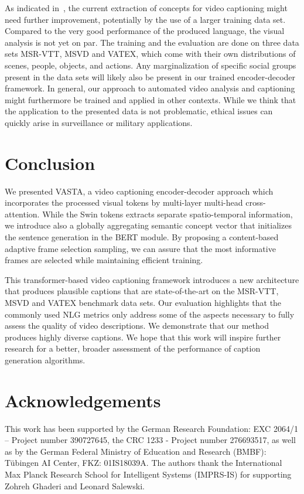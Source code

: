 \documentclass[runningheads,table]{llncs}
\newcommand{\modelName}{VASTA\xspace}
\begin{document}
As indicated in~, the current extraction of concepts for video captioning might need further improvement, potentially by the use of a larger training data set. Compared to the very good performance of the produced language, the visual analysis is not yet on par. 
The training and the evaluation are done on three data sets MSR-VTT, MSVD and VATEX, which come with their own distributions of scenes, people, objects, and actions. Any marginalization of specific social groups present in the data sets will likely also be present in our trained encoder-decoder framework. 
In general, our approach to automated video analysis and captioning might furthermore be trained and applied in other contexts. While we think that the application to the presented data is not problematic, ethical issues can quickly arise in surveillance or military applications. 



\section{Conclusion}
We presented \modelName, a video captioning encoder-decoder approach which incorporates the processed visual tokens by multi-layer multi-head cross-attention. While the Swin tokens extracts separate spatio-temporal information, we introduce also a globally aggregating semantic concept vector that initializes the sentence generation in the BERT module. 
By proposing a content-based adaptive frame selection sampling, we can assure that the most informative frames are selected while maintaining efficient training.

This transformer-based video captioning framework introduces a new architecture that produces plausible captions that are state-of-the-art on the MSR-VTT, MSVD and VATEX benchmark data sets. Our evaluation highlights that the commonly used NLG metrics only address some of the aspects necessary to fully assess the quality of video descriptions. We demonstrate that our method produces highly diverse captions. We hope that this work will inspire further research for a better, broader assessment of the performance of caption generation algorithms.
 \section{Acknowledgements} This work has been supported by the German Research Foundation: EXC 2064/1 – Project number 390727645, the CRC 1233 - Project number 276693517, as well as by the German Federal Ministry of Education and Research (BMBF): Tübingen AI Center, FKZ: 01IS18039A. The authors thank the International Max Planck Research School for Intelligent Systems (IMPRS-IS) for supporting Zohreh Ghaderi and Leonard Salewski.  


\end{document}
